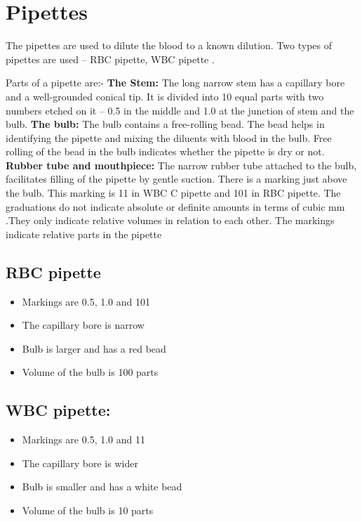 \documentclass[a4paper,12pt,openany,twoside]{book}
\begin{document}
					\section*{Pipettes}
					The pipettes are used to dilute the blood to a known dilution.
					Two types of pipettes are used – RBC pipette, WBC pipette .
					\par


					Parts of a pipette are:-\newline
					\textbf{The Stem:}
					The long narrow stem has a capillary bore and a well-grounded conical tip. It is divided into 10 equal parts with two numbers etched on it – 0.5 in the middle and 1.0 at the junction of stem and the bulb.\newline
					\textbf{The bulb:}
					The bulb contains a free-rolling bead. The bead helps in identifying the pipette and mixing the diluents with blood in the bulb. Free rolling of the bead in the bulb indicates whether the pipette is dry or not.\newline
					\textbf{Rubber tube and mouthpiece:}
					The narrow rubber tube attached to the bulb, facilitates filling of the pipette by gentle suction. There is a marking just above the bulb. This marking is 11 in WBC C pipette and 101 in RBC pipette. The graduations do not indicate absolute or definite amounts in terms of cubic mm .They only indicate relative volumes in relation to each other. The markings indicate relative parts in the pipette\newline

					\subsection*{RBC pipette}
					\begin{itemize}
						\itemsep0em
						\item{Markings are 0.5, 1.0 and 101}
						\item{The capillary bore is narrow}
						\item{Bulb is larger and has a red bead}
						\item{Volume of the bulb is 100 parts}
					\end{itemize}

					\subsection*{WBC pipette:}
					\begin{itemize}
						\itemsep0em
						\item{Markings are 0.5, 1.0 and 11}
						\item{The capillary bore is wider}
						\item{Bulb is smaller and has a white bead}
						\item{Volume of the bulb is 10 parts}
					\end{itemize}
\end{document}
